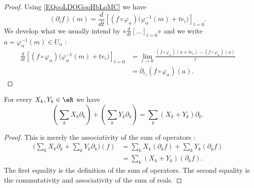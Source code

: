 \begin{proof}
	Using \eqref{EQooLDOGooHbLoMC} we have
	\begin{equation}
		(\partial_if)(m)=\frac{d}{dt} \left[ (f\circ\varphi_{\alpha})\big( \varphi_{\alpha}^{-1}(m)+te_i \big)  \right]_{t=0}.
	\end{equation}
	We develop what we usually intend by «\( \frac{d}{dt} \left[ \ldots  \right]_{t=0}\)» and we write \( a=\varphi_{\alpha}^{-1}(m)\in U_{\alpha}\) :
	\begin{subequations}
		\begin{align}
			\frac{d}{dt} \left[ (f\circ\varphi_{\alpha})\big( \varphi_{\alpha}^{-1}(m)+te_i \big)  \right]_{t=0} & =\lim_{t\to 0}\frac{ (f\circ\varphi_{\alpha})(a+te_i)-(f\circ\varphi_\alpha)(a) }{ t } \\
			                                                                                                     & =\partial_{e_i}(f\circ\varphi_{\alpha})(a).
		\end{align}
	\end{subequations}
\end{proof}

\begin{proposition}		\label{PROPooCGKRooLjlULU}
	For every \( X_k,Y_k\in \eR\) we have
	\begin{equation}
		\left( \sum_kX_k\partial_k \right)+\left( \sum_kY_k\partial_k \right)=\sum_k (X_k+Y_k)\partial_k.
	\end{equation}
\end{proposition}

\begin{proof}
	This is merely the associativity of the sum of operators :
	\begin{subequations}
		\begin{align}
			\Big( \sum_kX_k\partial_k+\sum_kY_k\partial_k \Big)(f) & =\sum_kX_k(\partial_kf)+\sum_kY_k(\partial_kf) \\
			                                                       & =\sum_k(X_k+Y_k)(\partial_kf).
		\end{align}
	\end{subequations}
	The first equality is the definition of the sum of operators. The second equality is the commutativity and associativity of the sum of reals.
\end{proof}


